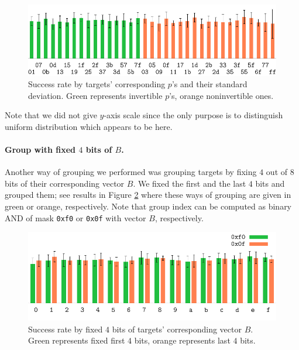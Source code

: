 	\begin{figure}[h]
	\begin{center}
		\includegraphics{figures/leak_target/leak_target.pdf}
		\caption{Success rate by targets' corresponding $p$'s and their standard deviation. Green represents invertible $p$'s, orange noninvertible ones.}
		\label{fig:leaktargethist}
	\end{center}
	\end{figure}
	
	Note that we did not give $y$-axis scale since the only purpose is to distinguish uniform distribution which appears to be here.
	
	\paragraph{Group with fixed $4$ bits of $B$.}
	
	Another way of grouping we performed was grouping targets by fixing $4$ out of $8$ bits of their corresponding vector $B$. We fixed the first and the last $4$ bits and grouped them; see results in Figure \ref{fig:leaktargetotherhist} where these ways of grouping are given in green or orange, respectively. Note that group index can be computed as binary AND of mask {\tt 0xf0} or {\tt 0x0f} with vector $B$, respectively.
	
	\begin{figure}[h]
	\begin{center}
		\includegraphics{figures/leak_target_other/leak_0x0f_0xf0.pdf}
		\caption{Success rate by fixed $4$ bits of targets' corresponding vector $B$. Green represents fixed first $4$ bits, orange represents last $4$ bits.}
		\label{fig:leaktargetotherhist}
	\end{center}
	\end{figure}
	
